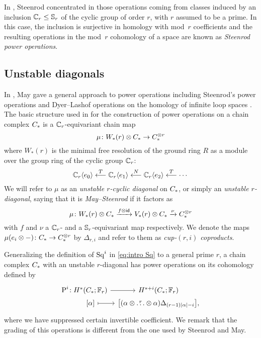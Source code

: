 In \cite{steenrod1953cyclic}, Steenrod concentrated in those operations coming from classes induced by an inclusion $\mathbb{C}_r \leq \mathbb{S}_r$ of the cyclic group of order $r$, with $r$ assumed to be a prime.
In this case, the inclusion is surjective in homology with mod~$r$ coefficients and the resulting operations in the mod~$r$ cohomology of a space are known as \textit{Steenrod power operations}.

\subsection{Unstable diagonals}

In \cite{may1970general}, May gave a general approach to power operations including Steenrod's power operations \cite{steenrod1962cohomology} and Dyer--Lashof operations on the homology of infinite loop spaces \cite{dyer62lashof}.
The basic structure used in \cite{may1970general} for the construction of power operations on a chain complex $C_{*}$ is a $\mathbb{C}_r$-equivariant chain map
\[
\mu \colon W_*(r) \otimes C_{*} \to C_{*}^{\otimes r}
\]
where $W_*(r)$ is the minimal free resolution of the ground ring $R$ as a module over the group ring of the cyclic group $\mathbb{C}_r$:
\[
\mathbb{C}_r\langle e_0\rangle
\overset{T}{\longleftarrow}
\mathbb{C}_r\langle e_1\rangle 
\overset{N}{\longleftarrow}
\mathbb{C}_r\langle e_2\rangle \overset{T}{\longleftarrow} 
\dotsb 
\]
We will refer to $\mu$ as an \textit{unstable $r$-cyclic diagonal} on $C_{*}$, or simply an \textit{unstable $r$-diagonal}, saying that it is \textit{May--Steenrod} if it factors as
\[
\mu \colon W_*(r) \otimes C_{*} \xrightarrow{f \otimes \mathsf{id}} V_*(r) \otimes C_{*} \xrightarrow{\nu} C_{*}^{\otimes r}
\]
with $f$ and $\nu$ a $\mathbb{C}_r$- and a $\mathbb{S}_r$-equivariant map respectively.
We denote the maps $\mu(e_i \otimes -) \colon C_{*} \to C_{*}^{\otimes r}$ by $\Delta_{r,i}$ and refer to them as \textit{cup-$(r,i)$ coproducts}.

Generalizing the definition of $\operatorname{Sq}^i$ in \cref{eq:intro Sq} to a general prime $r$, a chain complex $C_{*}$ with an unstable $r$-diagonal has power operations on its cohomology defined by
\begin{equation}\label{eq:intro P}
	\begin{tikzcd}[column sep=tiny, row sep=0]
		\power^i \colon &[-15pt] H^*(\ucadenas;\bF_r) \arrow[r] & H^{*+i}(\ucadenas;\bF_r) \\
		& {[\alpha]} \arrow[r, mapsto] & \big{[}(\alpha \ot \overset{r}{\dots} \ot \alpha)\Delta_{(r-1)\bars{\alpha}-i}\big{]},
	\end{tikzcd}
\end{equation}
where we have suppressed certain invertible coefficient.
We remark that the grading of this operations is different from the one used by Steenrod and May.

